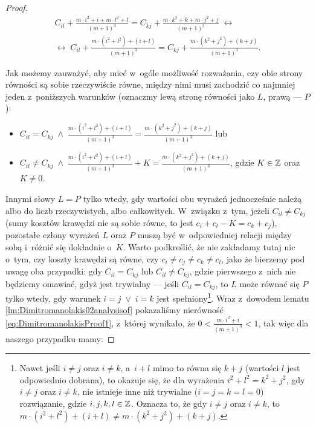 \begin{proof}
	\begin{gather}
		C_{il} + \frac{m \cdot i^{2} + i + m \cdot l^{2} + l}{\left( m + 1 \right)^{3}} = C_{kj} + \frac{m \cdot k^{2} + k + m \cdot j^{2} + j}{\left( m + 1 \right)^{3}} \; \leftrightarrow \\
		\leftrightarrow \; C_{il} + \frac{m \cdot \left( i^{2} + l^{2} \right) + \left( i + l \right)}{\left( m + 1 \right)^{3}} = C_{kj} + \frac{m \cdot \left( k^{2} + j^{2} \right) + \left( k + j \right)}{\left( m + 1 \right)^{3}}\text{.}
	\end{gather}
	
	Jak możemy zauważyć, aby mieć w~ogóle możliwość rozważania, czy obie strony równości są sobie rzeczywiście równe, między nimi musi zachodzić co najmniej jeden z~poniższych warunków (oznaczmy lewą stronę równości jako $L$, prawą --- $P$):
	
	\begin{itemize}
		\item $C_{il} = C_{kj} \; \wedge \; \frac{m \cdot \left( i^{2} + l^{2} \right) + \left( i + l \right)}{\left( m + 1 \right)^{3}} = \frac{m \cdot \left( k^{2} + j^{2} \right) + \left( k + j \right)}{\left( m + 1 \right)^{3}}$ lub
		\item $C_{il} \neq C_{kj} \; \wedge \; \frac{m \cdot \left( i^{2} + l^{2} \right) + \left( i + l \right)}{\left( m + 1 \right)^{3}} + K = \frac{m \cdot \left( k^{2} + j^{2} \right) + \left( k + j \right)}{\left( m + 1 \right)^{3}}$, gdzie $K \in \mathbb{Z}$ oraz $K \neq 0$.
	\end{itemize}
	
	Innymi słowy $L = P$ tylko wtedy, gdy wartości obu wyrażeń jednocześnie należą albo do liczb rzeczywistych, albo całkowitych. 
	W~związku z~tym, jeżeli $C_{il} \neq C_{kj}$ (sumy kosztów krawędzi nie są sobie równe, to jest $c_{i} + c_{l} - K = c_{k} + c_{j}$), pozostałe człony wyrażeń $L$ oraz $P$ muszą być w~odpowiedniej relacji między sobą i~różnić się dokładnie o~$K$.
	Warto podkreślić, że nie zakładamy tutaj nic o~tym, czy koszty krawędzi są równe, czy $c_{i} \neq c_{j} \neq c_{k} \neq c_{l}$, jako że bierzemy pod uwagę oba przypadki: gdy $C_{il} = C_{kj}$ lub $C_{il} \neq C_{kj}$, gdzie pierwszego z~nich nie będziemy omawiać, gdyż jest trywialny --- jeśli $C_{il} = C_{kj}$, to $L$ może równać się $P$ tylko wtedy, gdy warunek $i = j \; \vee \; i = k$ jest spełniony\footnote{
		Nawet jeśli $i \neq j$ oraz $i \neq k$, a~$i + l$ mimo to równa się $k + j$ (wartości $l$ jest odpowiednio dobrana), to okazuje się, że dla wyrażenia $i^{2} + l^{2} = k^{2} + j^{2}$, gdy $i \neq j$ oraz $i \neq k$, nie istnieje inne niż trywialne ($i = j = k = l = 0$) rozwiązanie, gdzie $i, j, k, l \in \mathbb{Z}$.
		Oznacza to, że gdy $i \neq j$ oraz $i \neq k$, to $m \cdot \left( i^{2} + l^{2} \right) + \left( i + l \right) \neq m \cdot \left( k^{2} + j^{2} \right) + \left( k + j \right)$.
	}.
	Wraz z~dowodem lematu \ref{lm:Dimitromanolakis02analysisof} pokazaliśmy nierówność \ref{eq:DimitromanolakisProof1}, z~której wynikało, że $0 < \frac{m \cdot i^{2} + i}{\left( m + 1 \right)^{3}} < 1$, tak więc dla naszego przypadku mamy:
	

\end{proof}
